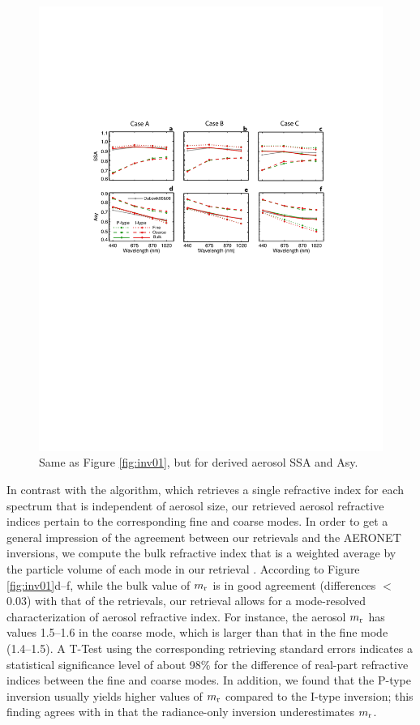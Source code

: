 \begin{figure}[t]
  \centering
  \includegraphics[width={\textwidth}]{figures/inv04.pdf}
  \caption{Same as Figure \ref{fig:inv01}, but for derived aerosol SSA and Asy.}
  \label{fig:inv02}
\end{figure}

In contrast with the \Dub algorithm, which retrieves a single
refractive index for each spectrum that is independent of aerosol size, our
retrieved aerosol refractive indices pertain to the corresponding fine and
coarse modes. In order to get a general impression of the agreement between our
retrievals and the AERONET inversions, we compute the bulk refractive index
that is a weighted average by the particle volume of each mode in our retrieval
\citep[e.g.,][]{Wang07}. According to Figure \ref{fig:inv01}d--f, while the 
bulk value of $m_\text{r}$ is in good agreement (differences $<$ 0.03) with that of
the \Dub retrievals, our retrieval allows for a mode-resolved characterization
 of aerosol refractive index. For instance, the aerosol $m_\text{r}$ has values 
1.5--1.6 in the coarse mode, which is larger than that in the fine mode (1.4--1.5).
A T-Test using the corresponding retrieving standard errors indicates a
statistical significance level of about 98\% for the difference of
real-part refractive indices between the fine and coarse modes. 
In addition, we found that the P-type inversion usually yields higher values of
$m_\text{r}$ compared to the I-type inversion; this finding agrees with \citet{Li09}
in that the radiance-only inversion underestimates $m_\text{r}$. 

